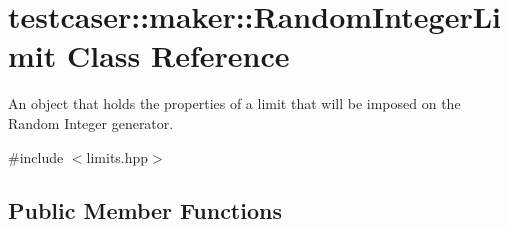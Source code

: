 \hypertarget{classtestcaser_1_1maker_1_1RandomIntegerLimit}{}\section{testcaser\+:\+:maker\+:\+:Random\+Integer\+Limit Class Reference}
\label{classtestcaser_1_1maker_1_1RandomIntegerLimit}


An object that holds the properties of a limit that will be imposed on the Random Integer generator.  




{\ttfamily \#include $<$limits.\+hpp$>$}

\subsection*{Public Member Functions}
